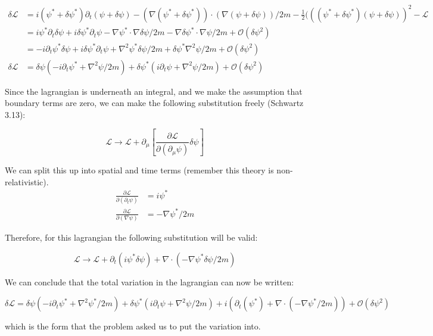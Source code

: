 \documentclass{article}
\newcommand{\Lagr}[0]{\mathcal{L}}
\newcommand{\order}[1]{\mathcal{O}\left( #1 \right)}
\begin{document}
\begin{align*}
\delta \Lagr & = i (\psi^* + \delta \psi^*) \partial_t (\psi + \delta \psi)
	- ( \nabla  (\psi^* + \delta \psi^*)  ) \cdot (\nabla (\psi + \delta \psi)) / 2 m
	- \frac{1}{2} (((\psi^* + \delta \psi^*) ( \psi + \delta \psi))^2 - \Lagr \\
	& = i \psi^* \partial_t \delta \psi
	+ i \delta \psi^* \partial_t \psi
	- \nabla \psi^* \cdot \nabla \delta \psi / 2m
	- \nabla \delta \psi^* \cdot \nabla \psi / 2m
	+ \order{\delta \psi^2} \\
	& = - i \partial_t \psi^* \delta \psi
	+ i \delta \psi^* \partial_t \psi
	+ \nabla^2 \psi^* \delta \psi / 2m
	+ \delta \psi^* \nabla^2 \psi / 2m
	+ \order{\delta \psi^2} \\
\delta \Lagr & = \delta \psi \left(
		- i \partial_t \psi^*
		+ \nabla^2 \psi / 2m \right)
	+ \delta \psi^* \left(
		i \partial_t \psi
		+ \nabla^2 \psi / 2m \right)
	+ \order{\delta \psi^2}
\end{align*}

Since the lagrangian is underneath an integral, and we make the assumption that boundary
	terms are zero, we can make the following substitution freely (Schwartz 3.13):

\[ \Lagr \to \Lagr + \partial_\mu \left[ \frac{\partial \Lagr}{\partial(\partial_\mu \psi)}
	\delta \psi \right] \]

We can split this up into spatial and time terms (remember this theory is non-relativistic).
\begin{align}
\frac{\partial \Lagr}{\partial(\partial_t \psi)}
	& = i \psi^* \\
\frac{\partial \Lagr}{\partial(\nabla \psi)}
	& = - \nabla \psi^* / 2 m 
\end{align}

Therefore, for this lagrangian the following substitution will be valid:

\[ \Lagr \to \Lagr + \partial_t (i \psi^* \delta \psi) 
	+ \nabla \cdot ( - \nabla \psi^* \delta \psi / 2 m) \]

We can conclude that the total variation in the lagrangian can now be written:

\[ \delta \Lagr = \delta \psi \left(
		- i \partial_t \psi^*
		+ \nabla^2 \psi^* / 2m \right)
	+ \delta \psi^* \left(
		i \partial_t \psi
		+ \nabla^2 \psi / 2m \right)
	+ i \left( \partial_t \left( \psi^* \right) 
		+ \nabla \cdot \left( - \nabla \psi^* / 2 m \right) \right)
	+ \order{\delta \psi^2} \]

which is the form that the problem asked us to put the variation into.
\end{document}
